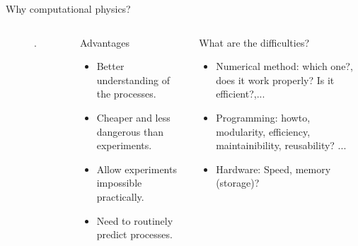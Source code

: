 \begin{frame}{Why computational physics?}
	\begin{scriptsize}
		\begin{columns}		
			\column{4cm}
      
      \begin{alertblock}{}%
        \begin{figure}
          \centering.
          \scalebox{0.65}{}
        \end{figure}
      \end{alertblock}
			
			\column{6cm}
			\begin{block}{Advantages}
				\begin{itemize}
					\item Better understanding of the processes.
					\item Cheaper and less dangerous than experiments.
					\item Allow experiments impossible practically.
					\item Need to routinely predict processes.
				\end{itemize}
			\end{block}
	
			\begin{block}{What are the difficulties?}
				\begin{itemize}
					\item Numerical method: which one?, does it work properly? Is it efficient?,...
					\item Programming: howto, modularity, efficiency, maintainibility, reusability? ...
					\item Hardware: Speed, memory (storage)?
				\end{itemize}
			\end{block}
		\end{columns}
	\end{scriptsize}	

\end{frame}
	



